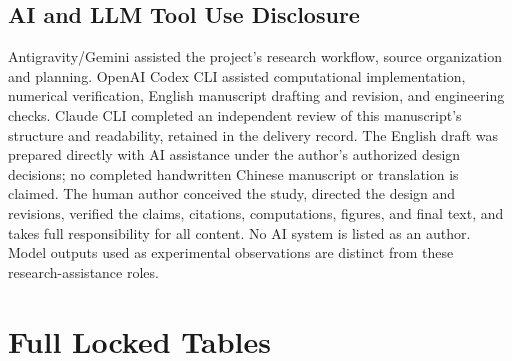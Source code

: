 \documentclass[11pt]{article}
\begin{document}
\subsection{AI and LLM Tool Use Disclosure}
Antigravity/Gemini assisted the project's research workflow, source organization and planning. OpenAI Codex CLI assisted computational implementation, numerical verification, English manuscript drafting and revision, and engineering checks. Claude CLI completed an independent review of this manuscript's structure and readability, retained in the delivery record. The English draft was prepared directly with AI assistance under the author's authorized design decisions; no completed handwritten Chinese manuscript or translation is claimed. The human author conceived the study, directed the design and revisions, verified the claims, citations, computations, figures, and final text, and takes full responsibility for all content. No AI system is listed as an author. Model outputs used as experimental observations are distinct from these research-assistance roles.

\clearpage


\clearpage\appendix
\section{Full Locked Tables}

\end{document}
